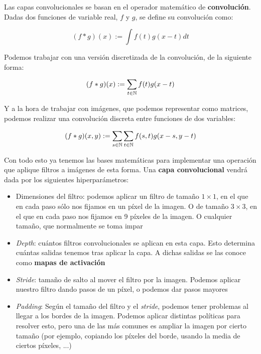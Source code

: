Las capas convolucionales se basan en el operador matemático de \textbf{convolución}. Dadas dos funciones de variable real, $f$ y $g$, se define su convolución como:

\begin{equation}
    (f * g)(x) := \int f(t) g(x - t) dt
\end{equation}

Podemos trabajar con una versión discretizada de la convolución, de la siguiente forma:

\begin{equation}
    (f * g)(x) := \sum_{t \in \mathbb{N}} f(t) g(x - t)
\end{equation}

Y a la hora de trabajar con imágenes, que podemos representar como matrices, podemos realizar una convolución discreta entre funciones de dos variables:

\begin{equation}
    (f * g)(x, y) := \sum_{s \in \mathbb{N}} \sum_{t \in \mathbb{N}} f(s, t) g(x - s, y - t)
\end{equation}

Con todo esto ya tenemos las bases matemáticas para implementar una operación que aplique filtros a imágenes de esta forma. Una \textbf{capa convolucional} vendrá dada por los siguientes hiperparámetros:

\begin{itemize}
    \item Dimensiones del filtro: podemos aplicar un filtro de tamaño $1 \times 1$, en el que en cada paso sólo nos fijamos en un píxel de la imagen. O de tamaño $3 \times 3$, en el que en cada paso nos fijamos en 9 píxeles de la imagen. O cualquier tamaño, que normalmente se toma impar
    \item \textit{Depth}: cuántos filtros convolucionales se aplican en esta capa. Esto determina cuántas salidas tenemos tras aplicar la capa. A dichas salidas se las conoce como \textbf{mapas de activación}
    \item \textit{Stride}: tamaño de salto al mover el filtro por la imagen. Podemos aplicar nuestro filtro dando pasos de un píxel, o podemos dar pasos mayores
    \item \textit{Padding}: Según el tamaño del filtro y el \textit{stride}, podemos tener problemas al llegar a los bordes de la imagen. Podemos aplicar distintas políticas para resolver esto, pero una de las más comunes es ampliar la imagen por cierto tamaño (por ejemplo, copiando los píxeles del borde, usando la media de ciertos píxeles, ...)
\end{itemize}

